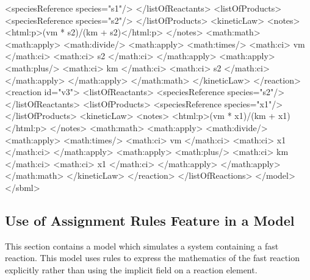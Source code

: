 \documentclass[10pt,twocolumntoc]{cekarticle}
\begin{document}
\begin{example}
                    <speciesReference species="s1"/>
                </listOfReactants>
                <listOfProducts>
                    <speciesReference species="s2"/>
                </listOfProducts>
                <kineticLaw>
                    <notes>
                        <html:p>(vm * s2)/(km + s2)</html:p>
                    </notes>
                    <math:math>
                        <math:apply>
                            <math:divide/>
                            <math:apply>
                                <math:times/>
                                <math:ci> vm </math:ci>
                                <math:ci> s2 </math:ci>
                            </math:apply>
                            <math:apply>
                                <math:plus/>
                                <math:ci> km </math:ci>
                                <math:ci> s2 </math:ci>
                            </math:apply>
                        </math:apply>
                    </math:math>
                </kineticLaw>
            </reaction>
            <reaction id="v3">
                <listOfReactants>
                    <speciesReference species="s2"/>
                </listOfReactants>
                <listOfProducts>
                    <speciesReference species="x1"/>
                </listOfProducts>
                <kineticLaw>
                    <notes>
                        <html:p>(vm * x1)/(km + x1)</html:p>
                    </notes>
                    <math:math>
                        <math:apply>
                            <math:divide/>
                            <math:apply>
                                <math:times/>
                                <math:ci> vm </math:ci>
                                <math:ci> x1 </math:ci>
                            </math:apply>
                            <math:apply>
                                <math:plus/>
                                <math:ci> km </math:ci>
                                <math:ci> x1 </math:ci>
                            </math:apply>
                        </math:apply>
                    </math:math>
                </kineticLaw>
            </reaction>
        </listOfReactions>
    </model>
</sbml>
\end{example}

\subsection{Use of Assignment Rules Feature in a Model}
\label{apdx:rules-eg}
This section contains a model which simulates a system containing
a fast reaction. This model uses rules to express the mathematics
of the fast reaction explicitly rather than using the implicit
 field on a reaction element.
\end{document}
